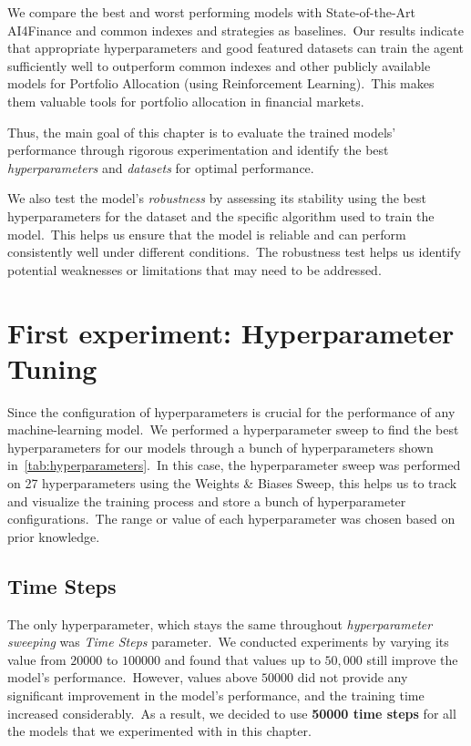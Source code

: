 \documentclass[../xlapes02]{subfiles}
\begin{document}
    We compare the best and worst performing models with State-of-the-Art AI4Finance and common indexes and strategies as baselines.\ Our results indicate that appropriate hyperparameters and good featured datasets can train the agent sufficiently well to outperform common indexes and other publicly available models for Portfolio Allocation (using Reinforcement Learning).\ This makes them valuable tools for portfolio allocation in financial markets.

    Thus, the main goal of this chapter is to evaluate the trained models' performance through rigorous experimentation and identify the best \emph{hyperparameters} and \emph{datasets} for optimal performance.\

    We also test the model's \emph{robustness} by assessing its stability using the best hyperparameters for the dataset and the specific algorithm used to train the model.\ This helps us ensure that the model is reliable and can perform consistently well under different conditions.\ The robustness test helps us identify potential weaknesses or limitations that may need to be addressed.


    \section{First experiment: Hyperparameter Tuning}\label{sec:first-experiment:-hyperparameter-tuning}
    Since the configuration of hyperparameters is crucial for the performance of any machine-learning model.\ We performed a hyperparameter sweep to find the best hyperparameters for our models through a bunch of hyperparameters shown in~\cref{tab:hyperparameters}.\ In this case, the hyperparameter sweep was performed on 27 hyperparameters using the Weights \& Biases Sweep, this helps us to track and visualize the training process and store a bunch of hyperparameter configurations.\ The range or value of each hyperparameter was chosen based on prior knowledge.

    \subsection{Time Steps}\label{subsec:time_steps}
    The only hyperparameter, which stays the same throughout \emph{hyperparameter sweeping} was \emph{Time Steps} parameter.\ We conducted experiments by varying its value from $20000$ to $100000$ and found that values up to $50,000$ still improve the model's performance.\ However, values above $50000$ did not provide any significant improvement in the model's performance, and the training time increased considerably.\ As a result, we decided to use \textbf{50000 time steps} for all the models that we experimented with in this chapter.
\end{document}
